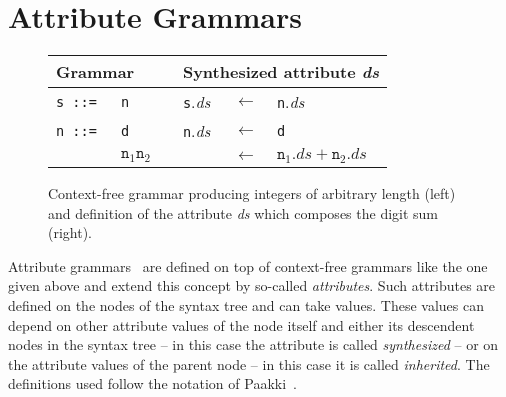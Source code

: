 \section{Attribute Grammars}\label{ag}
\begin{figure}\centering
\small
\begin{tabular}{llclcl}
\hline
\multicolumn{3}{l}{Grammar\hspace*{0.2\textwidth}}&\multicolumn{3}{l}{Synthesized attribute \textit{ds}}\\
\hline
\texttt{s ::=}& \texttt{n}&&\texttt{s}.\textit{ds}&$\leftarrow$ & \texttt{n}.\textit{ds}\\
\texttt{n ::= } & %
      \texttt{d} &&  \texttt{n}.\textit{ds} &$\leftarrow$ & %
      \texttt{d}%
      \\%
    &  $\texttt{n}_1 \texttt{n}_2$ &&& $\leftarrow$ & $\texttt{n}_1.\textit{ds} +\texttt{n}_2.\textit{ds}$\\
\hline
\end{tabular}
\normalsize
\caption{Context-free grammar producing integers of arbitrary length (left) and definition of the attribute \textit{ds} which composes the digit sum (right). \label{simplegrammar}}
\end{figure}
Attribute grammars~\cite{attributegrammar,ag2} are defined on top of context-free grammars like the one given above and extend this concept by so-called \emph{attributes}. 
Such attributes 
are defined on the nodes of the syntax tree 
 and can take values.
 These values can depend on other attribute values of the node itself and either its descendent nodes in the syntax tree -- in this case the attribute is called
 \emph{synthesized} -- or 
on the attribute values of the parent node -- in this case it is called \emph{inherited}.
The definitions used follow the notation of Paakki~\cite{Paakki}.



